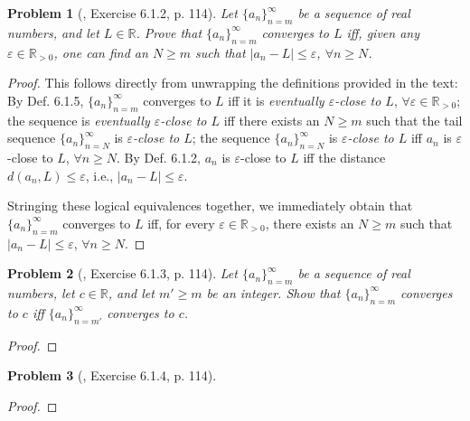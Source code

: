 \documentclass{article}
\newtheorem{problem}{Problem}
\begin{document}
\begin{problem}[\cite{Tao_analysis_1}, Exercise 6.1.2, p. 114]
	Let $\{a_n\}_{n=m}^\infty$ be a sequence of real numbers, and let $L\in\mathbb{R}$. Prove that $\{a_n\}_{n=m}^\infty$ converges to $L$ iff, given any $\varepsilon\in\mathbb{R}_{>0}$, one can find an $N\ge m$ such that $|a_n - L|\le\varepsilon$, $\forall n\ge N$.
\end{problem}

\begin{proof}[Proof]
	This follows directly from unwrapping the definitions provided in the text: By Def. 6.1.5, $\{a_n\}_{n=m}^\infty$ converges to $L$ iff it is \emph{eventually $\varepsilon$-close to $L$}, $\forall\varepsilon\in\mathbb{R}_{>0}$; the sequence is \emph{eventually $\varepsilon$-close to $L$} iff there exists an $N\ge m$ such that the tail sequence $\{a_n\}_{n=N}^\infty$ is \emph{$\varepsilon$-close to $L$}; the sequence $\{a_n\}_{n=N}^\infty$ is \emph{$\varepsilon$-close to $L$} iff $a_n$ is $\varepsilon$-close to $L$, $\forall n\ge N$. By Def. 6.1.2, $a_n$ is $\varepsilon$-close to $L$ iff the distance $d(a_n,L)\le\varepsilon$, i.e., $|a_n - L|\le\varepsilon$.
	
	Stringing these logical equivalences together, we immediately obtain that $\{a_n\}_{n=m}^\infty$ converges to $L$ iff, for every $\varepsilon\in\mathbb{R}_{>0}$, there exists an $N\ge m$ such that $|a_n - L|\le\varepsilon$, $\forall n\ge N$.
\end{proof}

\begin{problem}[\cite{Tao_analysis_1}, Exercise 6.1.3, p. 114]
	Let $\{a_n\}_{n=m}^\infty$ be a sequence of real numbers, let $c\in\mathbb{R}$, and let $m'\ge m$ be an integer. Show that $\{a_n\}_{n=m}^\infty$ converges to $c$ iff $\{a_n\}_{n=m'}^\infty$ converges to $c$.
\end{problem}

\begin{proof}[Proof]
	
\end{proof}

\begin{problem}[\cite{Tao_analysis_1}, Exercise 6.1.4, p. 114]
	
\end{problem}

\begin{proof}[Proof]
	
\end{proof}
\end{document}
